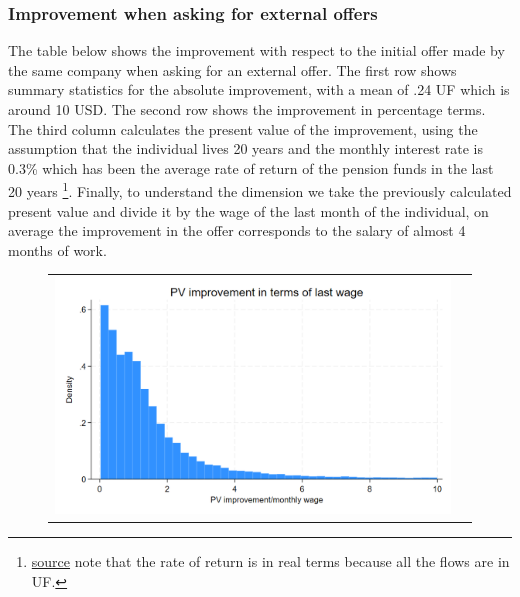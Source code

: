 \documentclass[12pt]{article}
\begin{document}



\subsubsection{Improvement when asking for external offers}

The table below shows the improvement with respect to the initial offer made by the same company when asking for an external offer. The first row shows summary statistics for the absolute improvement, with a mean of .24 UF which is around 10 USD. The second row shows the improvement in percentage terms. The third column calculates the present value of the improvement, using the assumption that the individual lives 20 years and the monthly interest rate is 0.3\% which has been the average rate of return of the pension funds in the last 20 years \footnote{\href{https://bigdatauls.userena.cl/dashboards/rentabilidad-fondo-de-pensiones/}{source} note that the rate of return is in real terms because all the flows are in UF.}. Finally, to understand the dimension we take the previously calculated present value and divide it by the wage of the last month of the individual, on average the improvement in the offer corresponds to the salary of almost 4 months of work.  



\begin{figure}[H]
\caption{}
\label{fig:aux}
\centering{}%
\begin{tabular}{cc}
\includegraphics[scale=0.3]{figures/IE3_offer_improvement_histogram.png}
\end{tabular}
\end{figure}
\end{document}
